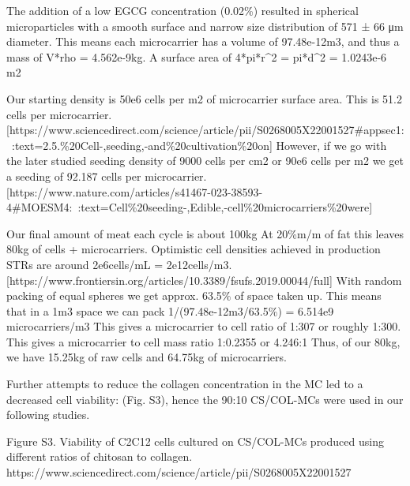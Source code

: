 The addition of a low EGCG concentration (0.02\%) resulted in spherical microparticles with a smooth surface and narrow size distribution of 571 ± 66 μm diameter. This means each microcarrier has a 
volume of 97.48e-12m3, and thus a 
mass of V*rho = 4.562e-9kg.
A surface area of 4*pi*r^2 = pi*d^2 = 1.0243e-6 m2

Our starting density is 50e6 cells per m2 of microcarrier surface area. This is 51.2 cells per microcarrier. [https://www.sciencedirect.com/science/article/pii/S0268005X22001527#appsec1:~:text=2.5.\%20Cell-,seeding,-and\%20cultivation\%20on]
However, if we go with the later studied seeding density of 9000 cells per cm2 or 90e6 cells per m2 we get a seeding of 92.187 cells per microcarrier.
[https://www.nature.com/articles/s41467-023-38593-4#MOESM4:~:text=Cell\%20seeding-,Edible,-cell\%20microcarriers\%20were]

Our final amount of meat each cycle is about 100kg
At 20\%m/m of fat this leaves 80kg of cells + microcarriers.
Optimistic cell densities achieved in production STRs are around 2e6cells/mL = 2e12cells/m3. [https://www.frontiersin.org/articles/10.3389/fsufs.2019.00044/full]
With random packing of equal spheres we get approx. 63.5\% of space taken up.
This means that in a 1m3 space we can pack 1/(97.48e-12m3/63.5\%) = 6.514e9 microcarriers/m3
This gives a microcarrier to cell ratio of 1:307 or roughly 1:300.
This gives a microcarrier to cell mass ratio 1:0.2355 or 4.246:1
Thus, of our 80kg, we have 15.25kg of raw cells and 64.75kg of microcarriers.

Further attempts to reduce the collagen concentration in the MC led to a decreased cell viability: (Fig. S3), hence the 90:10 CS/COL-MCs were used in our following studies.
 
Figure S3. Viability of C2C12 cells cultured on CS/COL-MCs produced using different ratios of chitosan to collagen. 
https://www.sciencedirect.com/science/article/pii/S0268005X22001527


